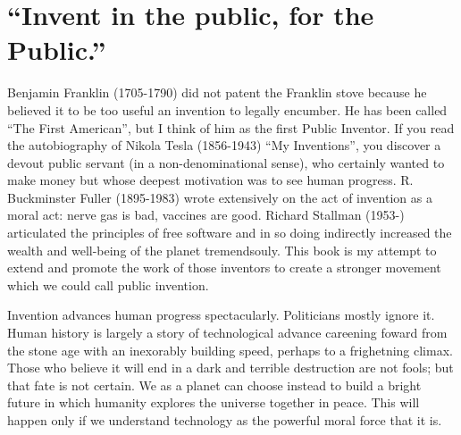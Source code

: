 \documentclass[
	fontsize=10pt, %
	twoside=false, %
	secnumdepth=1, %
]{kaobook}
\begin{document}
\listoftables %

\endgroup


\mainmatter %


\chapter{“Invent in the public, for the Public.”}


Benjamin Franklin (1705-1790) did not patent the Franklin stove because
he believed it to be too useful an invention to legally encumber.
He has been
called ``The First American''\cite{Brands2000}, but I think of him as the
first Public Inventor.
If you read the autobiography of Nikola Tesla (1856-1943)
``My Inventions''\cite{Tesla1982},
you discover a devout public servant
(in a non-denominational sense), who certainly wanted to make
money but whose deepest motivation was to see human progress.
R. Buckminster Fuller (1895-1983) wrote extensively on the act of invention
as a moral act: nerve gas is bad, vaccines are good\cite{Fuller1981}.
Richard Stallman (1953-) articulated the principles of free software
and in so doing indirectly increased the wealth and well-being
of the planet tremendsouly\cite{Stallman2002free}.
This book is my attempt to extend and promote the work of
those inventors to create a stronger movement which we could
call public invention.

\nocite{laurel2001}
\nocite{jonassalk}
\nocite{boldrin2008against}

Invention advances human progress spectacularly.
Politicians mostly ignore it.
Human history is largely a story of technological
advance careening foward from the stone age with
an inexorably building speed,
perhaps to a frighetning climax.
Those who believe it will end in a dark and terrible
destruction are not fools;
but that fate is not certain.
We as a planet can choose instead to build a bright future
in which humanity explores the universe together in peace.
This will happen only if we understand technology as the
powerful moral force that it is.
\end{document}

